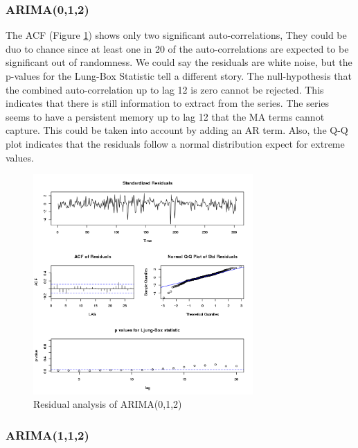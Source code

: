 \subsubsection{ARIMA(0,1,2)}The ACF (Figure \ref{fig:residuals_model1}) shows only two significant auto-correlations, They could be duo to chance since at least one in 20 of the auto-correlations are expected to be significant out of randomness. We could say the residuals are white noise, but the p-values for the  Lung-Box Statistic tell a different story. The null-hypothesis that the combined auto-correlation up to lag 12 is zero cannot be rejected.  This indicates that there is still information to extract from the series. The series seems to have a persistent memory up to lag 12 that the MA terms cannot capture. This could be taken into account by adding an AR term.  Also, the Q-Q plot indicates that the residuals follow a normal distribution expect for extreme values. 

\begin{figure}[!htb]
\begin{center}
\includegraphics[width=8.4cm]{residuals_model1.png}    %
\caption{Residual analysis of ARIMA(0,1,2)} 
\label{fig:residuals_model1}
\end{center}
\end{figure}

                   

\subsubsection{ARIMA(1,1,2)}

